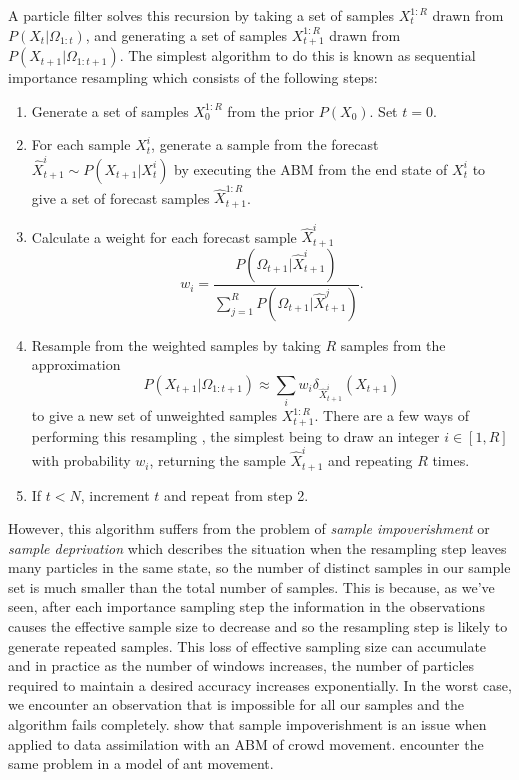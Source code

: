 \documentclass{article}
\begin{document}
A particle filter solves this recursion by taking a set of samples $X_t^{1:R}$ drawn from $P(X_t|\Omega_{1:t})$, and generating a set of samples  $X_{t+1}^{1:R}$ drawn from $P(X_{t+1}|\Omega_{1:t+1})$. The simplest algorithm to do this is known as sequential importance resampling which consists of the following steps:
\begin{enumerate}
\item Generate a set of samples $X^{1:R}_0$ from the prior $P(X_0)$. Set $t=0$.

\item For each sample $X_t^i$, generate a sample from the forecast $\hat{X}_{t+1}^i \sim P(X_{t+1}|X^i_t)$ by executing the ABM from the end state of $X^i_t$ to give a set of forecast samples $\hat{X}^{1:R}_{t+1}$.

\item Calculate a weight for each forecast sample $\hat{X}_{t+1}^i$
\[
w_i = \frac{P(\Omega_{t+1}|\hat{X}_{t+1}^i)}{\sum_{j=1}^R P(\Omega_{t+1}|\hat{X}_{t+1}^j)}.
\]

\item Resample from the weighted samples by taking $R$ samples from the approximation
\begin{equation}
P(X_{t+1}|\Omega_{1:t+1}) \approx  \sum_i w_i\delta_{\hat{X}_{t+1}^i}\left(X_{t+1}\right)
\label{importanceApprox}
\end{equation}
to give a new set of unweighted samples $X^{1:R}_{t+1}$. There are a few ways of performing this resampling \citep{douc2005comparison}, the simplest being to draw an integer $i\in[1,R]$ with probability $w_i$, returning the sample $\hat{X}_{t+1}^i$ and repeating $R$ times.

\item If $t<N$, increment $t$ and repeat from step 2.

\end{enumerate}

However, this algorithm suffers from the problem of \textit{sample impoverishment} \citep{li2014fight} or \textit{sample deprivation} which describes the situation when the resampling step leaves many particles in the same state, so the number of distinct samples in our sample set is much smaller than the total number of samples. This is because, as we've seen, after each importance sampling step the information in the observations causes the effective sample size to decrease and so the resampling step is likely to generate repeated samples. This loss of effective sampling size can accumulate and in practice as the number of windows increases, the number of particles required to maintain a desired accuracy increases exponentially. In the worst case, we encounter an observation that is impossible for all our samples and the algorithm fails completely. \citet{malleson_simulating_2020} show that sample impoverishment is an issue when applied to data assimilation with an ABM of crowd movement. \citet{khan2003efficient} encounter the same problem in a model of ant movement.
\end{document}
